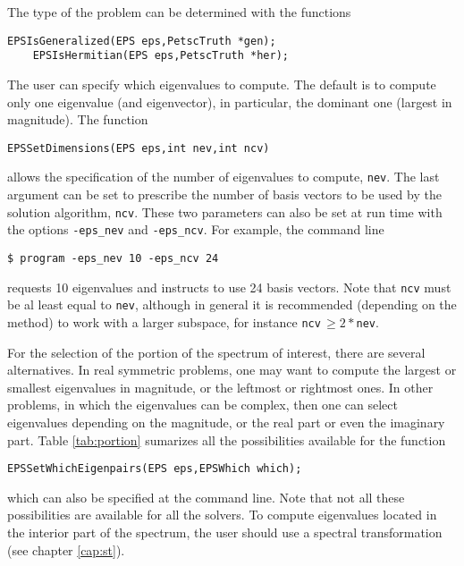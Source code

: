 	The type of the problem can be determined with the functions
	 
	\begin{Verbatim}[fontsize=\small]
	EPSIsGeneralized(EPS eps,PetscTruth *gen);
	EPSIsHermitian(EPS eps,PetscTruth *her);
	\end{Verbatim}

	The user can specify which eigenvalues to compute. The default is to compute only one eigenvalue (and eigenvector), in particular, the dominant one (largest in magnitude). The function
	\begin{Verbatim}[fontsize=\small]
	EPSSetDimensions(EPS eps,int nev,int ncv)
	\end{Verbatim}
allows the specification of the number of eigenvalues to compute, \texttt{nev}. The last argument can be set to prescribe the number of basis vectors to be used by the solution algorithm, \texttt{ncv}. These two parameters can also be set at run time with the options \Verb!-eps_nev! and \Verb!-eps_ncv!. For example, the command line
\begin{Verbatim}[fontsize=\small]
	$ program -eps_nev 10 -eps_ncv 24
\end{Verbatim}
requests 10 eigenvalues and instructs to use 24 basis vectors. Note that \texttt{ncv} must be al least equal to \texttt{nev}, although in general it is recommended (depending on the method) to work with a larger subspace, for instance \texttt{ncv}$\,\geq \!2*$\texttt{nev}.

	For the selection of the portion of the spectrum of interest, there are several alternatives. In real symmetric problems, one may want to compute the largest or smallest eigenvalues in magnitude, or the leftmost or rightmost ones. In other problems, in which the eigenvalues can be complex, then one can select eigenvalues depending on the magnitude, or the real part or even the imaginary part. Table \ref{tab:portion} sumarizes all the possibilities available for the function
	\begin{Verbatim}[fontsize=\small]
	EPSSetWhichEigenpairs(EPS eps,EPSWhich which);
	\end{Verbatim}
which can also be specified at the command line. Note that not all these possibilities are available for all the solvers. To compute eigenvalues located in the interior part of the spectrum, the user should use a spectral transformation (see chapter \ref{cap:st}).

